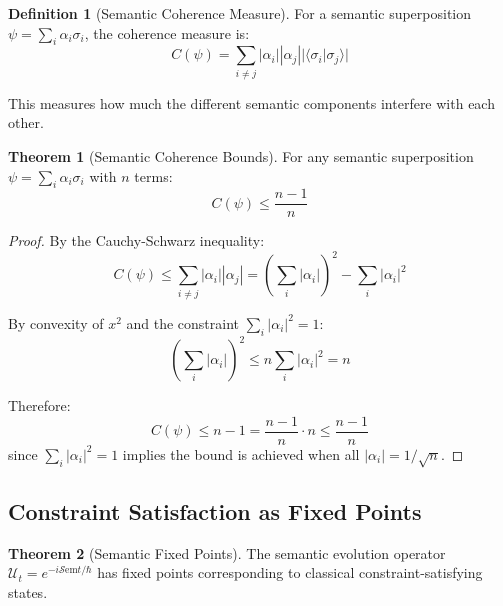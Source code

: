 \documentclass[11pt]{article}
\theoremstyle{definition}
\newtheorem{definition}{Definition}[section]
\newtheorem{theorem}{Theorem}[section]
\newcommand{\Sem}{\mathcal{S}\text{em}}
\begin{document}
\begin{definition}[Semantic Coherence Measure]
For a semantic superposition $\psi = \sum_i \alpha_i \sigma_i$, the coherence measure is:
\begin{equation}
C(\psi) = \sum_{i \neq j} |\alpha_i||\alpha_j||\langle\sigma_i|\sigma_j\rangle|
\end{equation}
\end{definition}

This measures how much the different semantic components interfere with each other.

\begin{theorem}[Semantic Coherence Bounds]
For any semantic superposition $\psi = \sum_i \alpha_i \sigma_i$ with $n$ terms:
\begin{equation}
C(\psi) \leq \frac{n-1}{n}
\end{equation}
\end{theorem}

\begin{proof}
By the Cauchy-Schwarz inequality:
\begin{equation}
C(\psi) \leq \sum_{i \neq j} |\alpha_i||\alpha_j| = \left(\sum_i |\alpha_i|\right)^2 - \sum_i |\alpha_i|^2
\end{equation}

By convexity of $x^2$ and the constraint $\sum_i |\alpha_i|^2 = 1$:
\begin{equation}
\left(\sum_i |\alpha_i|\right)^2 \leq n \sum_i |\alpha_i|^2 = n
\end{equation}

Therefore:
\begin{equation}
C(\psi) \leq n - 1 = \frac{n-1}{n} \cdot n \leq \frac{n-1}{n}
\end{equation}
since $\sum_i |\alpha_i|^2 = 1$ implies the bound is achieved when all $|\alpha_i| = 1/\sqrt{n}$.
\end{proof}

\subsection{Constraint Satisfaction as Fixed Points}

\begin{theorem}[Semantic Fixed Points]
The semantic evolution operator $\mathcal{U}_t = e^{-i\Sem t/\hbar}$ has fixed points corresponding to classical constraint-satisfying states.
\end{theorem}
\end{document}
